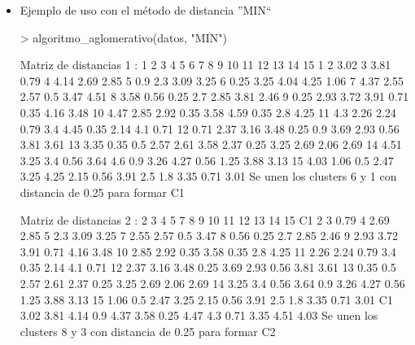 \documentclass[a4paper, 12pt]{article}
\begin{document}
	\begin{itemize}
		\item Ejemplo de uso con el método de distancia ''MIN``
\begin{Schunk}
\begin{Sinput}
> algoritmo_aglomerativo(datos, "MIN")
\end{Sinput}
\begin{Soutput}
Matriz de distancias 1 :
   1    2    3    4    5    6    7    8    9    10   11   12   13   14   15
1                                                                          
2  3.02                                                                    
3  3.81 0.79                                                               
4  4.14 2.69 2.85                                                          
5  0.9  2.3  3.09 3.25                                                     
6  0.25 3.25 4.04 4.25 1.06                                                
7  4.37 2.55 2.57 0.5  3.47 4.51                                           
8  3.58 0.56 0.25 2.7  2.85 3.81 2.46                                      
9  0.25 2.93 3.72 3.91 0.71 0.35 4.16 3.48                                 
10 4.47 2.85 2.92 0.35 3.58 4.59 0.35 2.8  4.25                            
11 4.3  2.26 2.24 0.79 3.4  4.45 0.35 2.14 4.1  0.71                       
12 0.71 2.37 3.16 3.48 0.25 0.9  3.69 2.93 0.56 3.81 3.61                  
13 3.35 0.35 0.5  2.57 2.61 3.58 2.37 0.25 3.25 2.69 2.06 2.69             
14 4.51 3.25 3.4  0.56 3.64 4.6  0.9  3.26 4.27 0.56 1.25 3.88 3.13        
15 4.03 1.06 0.5  2.47 3.25 4.25 2.15 0.56 3.91 2.5  1.8  3.35 0.71 3.01   
Se unen los clusters 6 y 1 con distancia de 0.25 para formar C1 

Matriz de distancias 2 :
   2    3    4    5    7    8    9    10   11   12   13   14   15   C1
2                                                                     
3  0.79                                                               
4  2.69 2.85                                                          
5  2.3  3.09 3.25                                                     
7  2.55 2.57 0.5  3.47                                                
8  0.56 0.25 2.7  2.85 2.46                                           
9  2.93 3.72 3.91 0.71 4.16 3.48                                      
10 2.85 2.92 0.35 3.58 0.35 2.8  4.25                                 
11 2.26 2.24 0.79 3.4  0.35 2.14 4.1  0.71                            
12 2.37 3.16 3.48 0.25 3.69 2.93 0.56 3.81 3.61                       
13 0.35 0.5  2.57 2.61 2.37 0.25 3.25 2.69 2.06 2.69                  
14 3.25 3.4  0.56 3.64 0.9  3.26 4.27 0.56 1.25 3.88 3.13             
15 1.06 0.5  2.47 3.25 2.15 0.56 3.91 2.5  1.8  3.35 0.71 3.01        
C1 3.02 3.81 4.14 0.9  4.37 3.58 0.25 4.47 4.3  0.71 3.35 4.51 4.03   
Se unen los clusters 8 y 3 con distancia de 0.25 para formar C2 


\end{Soutput}
\end{Schunk}
\end{itemize}
\end{document}
